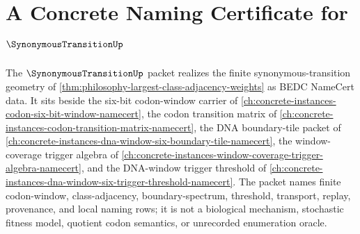 \chapter{A Concrete Naming Certificate for $\SynonymousTransitionUp$}
\label{ch:concrete-instances-synonymous-transition-namecert}

The $\SynonymousTransitionUp$ packet realizes the finite synonymous-transition geometry of \autoref{thm:philosophy-largest-class-adjacency-weights} as BEDC NameCert data. It sits beside the six-bit codon-window carrier of \autoref{ch:concrete-instances-codon-six-bit-window-namecert}, the codon transition matrix of \autoref{ch:concrete-instances-codon-transition-matrix-namecert}, the DNA boundary-tile packet of \autoref{ch:concrete-instances-dna-window-six-boundary-tile-namecert}, the window-coverage trigger algebra of \autoref{ch:concrete-instances-window-coverage-trigger-algebra-namecert}, and the DNA-window trigger threshold of \autoref{ch:concrete-instances-dna-window-six-trigger-threshold-namecert}. The packet names finite codon-window, class-adjacency, boundary-spectrum, threshold, transport, replay, provenance, and local naming rows; it is not a biological mechanism, stochastic fitness model, quotient codon semantics, or unrecorded enumeration oracle.


